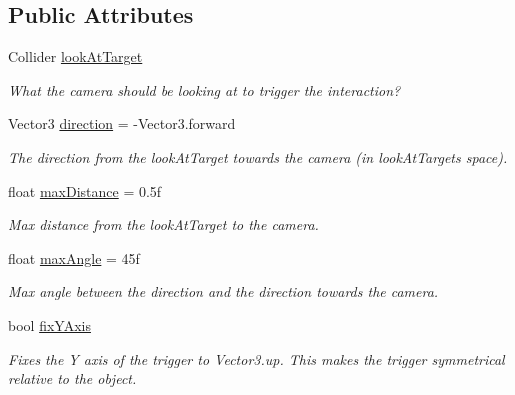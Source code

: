 \subsection*{Public Attributes}
\begin{DoxyCompactItemize}
\item 
Collider \mbox{\hyperlink{class_root_motion_1_1_final_i_k_1_1_interaction_trigger_1_1_camera_position_a2a3752e82f2716e0e7537e05e6650ae9}{look\+At\+Target}}
\begin{DoxyCompactList}\small\item\em What the camera should be looking at to trigger the interaction? \end{DoxyCompactList}\item 
Vector3 \mbox{\hyperlink{class_root_motion_1_1_final_i_k_1_1_interaction_trigger_1_1_camera_position_a596c6798f0a1ec11cd0350fd0f268a0a}{direction}} = -\/Vector3.\+forward
\begin{DoxyCompactList}\small\item\em The direction from the look\+At\+Target towards the camera (in look\+At\+Target\textquotesingle{}s space). \end{DoxyCompactList}\item 
float \mbox{\hyperlink{class_root_motion_1_1_final_i_k_1_1_interaction_trigger_1_1_camera_position_a531e9c3c0f8e117d17ac32a4251170d7}{max\+Distance}} = 0.\+5f
\begin{DoxyCompactList}\small\item\em Max distance from the look\+At\+Target to the camera. \end{DoxyCompactList}\item 
float \mbox{\hyperlink{class_root_motion_1_1_final_i_k_1_1_interaction_trigger_1_1_camera_position_a970c0e04f2369bcea48c0bd02bfb681a}{max\+Angle}} = 45f
\begin{DoxyCompactList}\small\item\em Max angle between the direction and the direction towards the camera. \end{DoxyCompactList}\item 
bool \mbox{\hyperlink{class_root_motion_1_1_final_i_k_1_1_interaction_trigger_1_1_camera_position_a725a4920626426ac4bf20c6d5f10106c}{fix\+Y\+Axis}}
\begin{DoxyCompactList}\small\item\em Fixes the Y axis of the trigger to Vector3.\+up. This makes the trigger symmetrical relative to the object. \end{DoxyCompactList}\end{DoxyCompactItemize}


